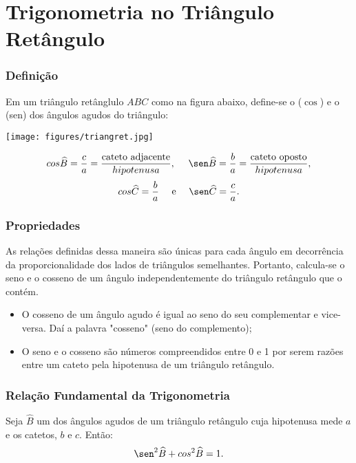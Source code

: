 \documentclass[brazil, notheorems, 10pt]{beamer}
\begin{document}
\section{Trigonometria no Triângulo Retângulo}
\begin{frame} \frametitle{Definição}
\begin{Def}
Em um triângulo retânglulo $ABC$ como na figura abaixo, define-se o
 ($\cos$) e o  (sen) dos ângulos agudos do
triângulo:
\begin{center}
\texttt{[image: figures/triangret.jpg]}
\end{center}
$$\cos \widehat B = \frac c a = \frac {\text{cateto
adjacente}}{hipotenusa}, \ \ \ \ \sen \widehat B = \frac b a = \frac
{\text{cateto oposto}}{hipotenusa},$$
$$\cos \widehat C = \frac b a \ \ \ \ \text{e} \ \ \ \ \sen \widehat
C = \frac c a.$$
\end{Def}



\end{frame}


\begin{frame}
\frametitle{Propriedades} %
As relações definidas dessa maneira são únicas para cada ângulo em
decorrência da proporcionalidade dos lados de triângulos
semelhantes. Portanto, calcula-se o seno e o cosseno de um ângulo
independentemente do triângulo retângulo que o contém.

\begin{Prop}
\begin{itemize}
	\item O cosseno de um ângulo agudo é igual ao seno do seu
	complementar e vice-versa. Daí a palavra "cosseno" (seno do
	complemento);
	\item O seno e o cosseno são números compreendidos entre 0 e 1 por
	serem razões entre um cateto pela hipotenusa de um triângulo
	retângulo.
\end{itemize}
\end{Prop}




\end{frame}


\begin{frame}
\frametitle{Relação Fundamental da Trigonometria} %

\begin{Prop}
Seja $\widehat B$ um dos ângulos agudos de um triângulo retângulo
cuja hipotenusa mede $a$ e os catetos, $b$ e $c$. Então:
$$\sen^2 \widehat B + \cos^2 \widehat B = 1.$$
\end{Prop}
\end{frame}
\end{document}
